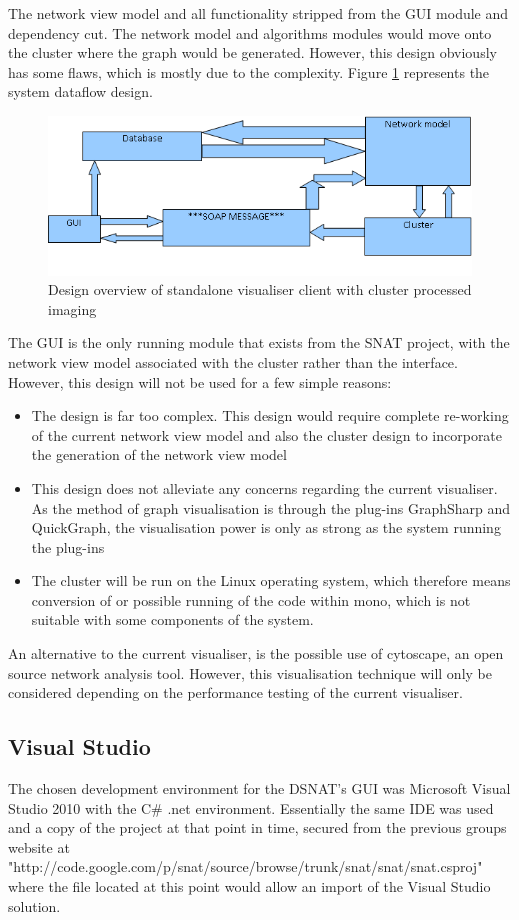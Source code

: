 The network view model and all functionality stripped from the GUI module and dependency cut. The network model and algorithms modules would move onto the cluster where the graph would be generated. However, this design obviously has some flaws, which is mostly due to the complexity. Figure \ref{fig:des2} represents the system dataflow design.

\begin{figure}%
\centering
\includegraphics[width=0.6\columnwidth]{./img/des2}%
\caption{Design overview of standalone visualiser client with cluster processed imaging}%
\label{fig:des2}%
\end{figure}

The GUI is the only running module that exists from the SNAT project, with the network view model associated with the cluster rather than the interface. However, this design will not be used for a few simple reasons:

\begin{itemize}
	\item The design is far too complex. This design would require complete re-working of the current network view model and also the cluster design to incorporate the generation of the network view model
	
	\item This design does not alleviate any concerns regarding the current visualiser. As the method of graph visualisation is through the plug-ins GraphSharp and QuickGraph, the visualisation power is only as strong as the system running the plug-ins
	
	\item The cluster will be run on the Linux operating system, which therefore means conversion of or possible running of the code within mono, which is not suitable with some components of the system.
\end{itemize}

An alternative to the current visualiser, is the possible use of cytoscape, an open source network analysis tool. However, this visualisation technique will only be considered depending on the performance testing of the current visualiser.

\subsection{Visual Studio}
The chosen development environment for the DSNAT's GUI was Microsoft Visual Studio 2010 with the C# .net environment. Essentially the same IDE was used and a copy of the project at that point in time, secured from the previous groups website at "http://code.google.com/p/snat/source/browse/trunk/snat/snat/snat.csproj" where the file located at this point would allow an import of the Visual Studio solution.

